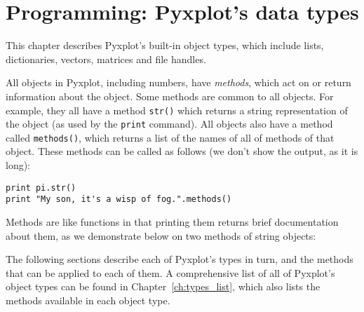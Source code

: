 %
%
%
%
%



\chapter{Programming: Pyxplot's data types}
\label{chap:progDataTypes}

This chapter describes Pyxplot's built-in object types, which include lists,
dictionaries, vectors, matrices and file handles.

All objects in Pyxplot, including numbers, have {\it methods}, which act on or
return information about the object. Some methods are common to all objects.
For example, they all have a method {\tt str()} which returns a string
representation of the object (as used by the {\tt print} command). All objects
also have a method called {\tt methods()}, which returns a list of the names of
all of methods of that object. These methods can be called as follows (we don't
show the output, as it is long):

\begin{verbatim}
print pi.str()
print "My son, it's a wisp of fog.".methods()
\end{verbatim}

\noindent Methods are like functions in that printing them returns brief
documentation about them, as we demonstrate below on two methods of string
objects:

\vspace{3mm}

\vspace{3mm}

The following sections describe each of Pyxplot's types in turn, and the
methods that can be applied to each of them.  A comprehensive list of all of
Pyxplot's object types can be found in Chapter~\ref{ch:types_list}, which also
lists the methods available in each object type.

